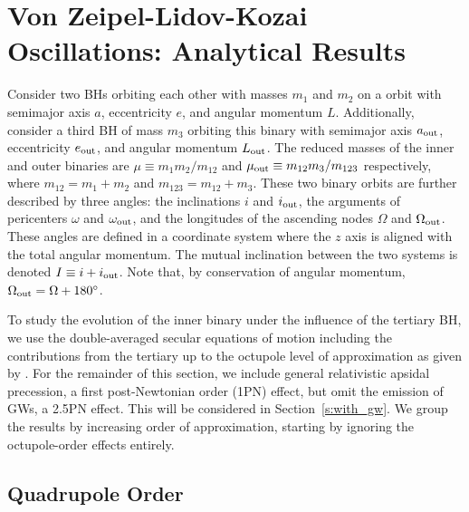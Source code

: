 \documentclass[
        fleqn,
        usenatbib,
    ]{mnras}
\begin{document}
\section{Von Zeipel-Lidov-Kozai Oscillations: Analytical
Results}\label{s:background}

Consider two BHs orbiting each other with masses $m_1$ and $m_2$ on a orbit with
semimajor axis $a$, eccentricity $e$, and angular momentum $L$. Additionally,
consider a third BH of mass $m_3$ orbiting this binary with semimajor axis
$a_{\rm out}$, eccentricity $e_{\rm out}$, and angular momentum $L_{\rm
out}$. The reduced masses of the inner and outer binaries are $\mu \equiv m_1m_2
/ m_{12}$ and $\mu_{\rm out} \equiv m_{12} m_3 / m_{123}$ respectively, where
$m_{12} = m_1 + m_2$ and $m_{123} = m_{12} + m_3$. These two binary orbits are
further described by three angles: the inclinations $i$ and $i_{\rm out}$, the
arguments of pericenters $\omega$ and $\omega_{\rm out}$, and the longitudes of
the ascending nodes $\Omega$ and $\Omega_{\rm out}$. These angles are defined in
a coordinate system where the $z$ axis is aligned with the total angular
momentum. The mutual inclination between the two systems is denoted $I \equiv i
+ i_{\rm out}$. Note that, by conservation of angular momentum, $\Omega_{\rm
out} = \Omega + 180^\circ$.

To study the evolution of the inner binary under the influence of the tertiary
BH, we use the double-averaged secular equations of motion including the
contributions from the tertiary up to the octupole level of approximation as
given by \citet{LML15}. For the remainder of this section, we include general
relativistic apsidal precession, a first post-Newtonian order (1PN) effect, but
omit the emission of GWs, a 2.5PN effect. This will be considered in
Section~\ref{s:with_gw}. We group the results by increasing order of
approximation, starting by ignoring the octupole-order effects entirely.

\subsection{Quadrupole Order}
\end{document}
